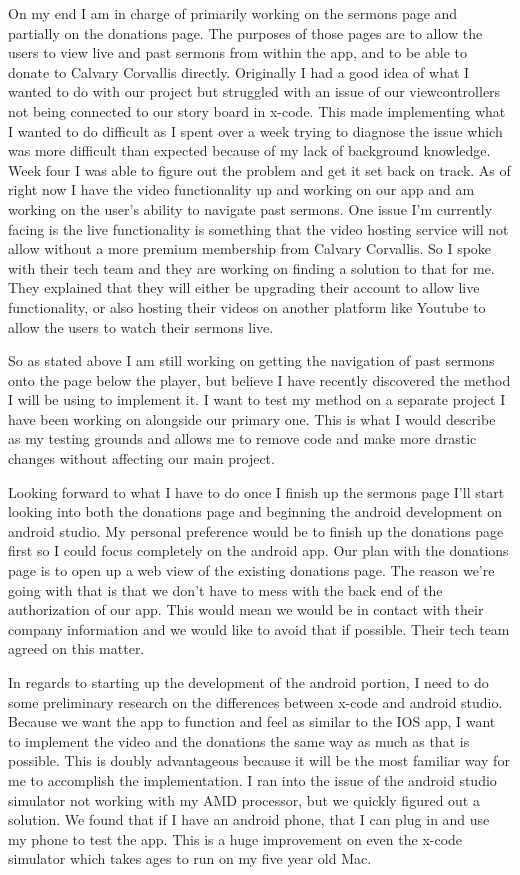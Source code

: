 \documentclass[letterpaper,10pt,draftclsnofoot,onecolumn,titlepage]{IEEEtran}
\begin{document}
	On my end I am in charge of primarily working on the sermons page and partially on the donations page.
	The purposes of those pages are to allow the users to view live and past sermons from within the app, and to be able to donate to Calvary Corvallis directly.
	Originally I had a good idea of what I wanted to do with our project but struggled with an issue of our viewcontrollers not being connected to our story board in x-code.
	This made implementing what I wanted to do difficult as I spent over a week trying to diagnose the issue which was more difficult than expected because of my lack of background knowledge.
	Week four I was able to figure out the problem and get it set back on track.
	As of right now I have the video functionality up and working on our app and am working on the user’s ability to navigate past sermons.
	One issue I’m currently facing is the live functionality is something that the video hosting service will not allow without a more premium membership from Calvary Corvallis.
	So I spoke with their tech team and they are working on finding a solution to that for me.
	They explained that they will either be upgrading their account to allow live functionality, or also hosting their videos on another platform like Youtube to allow the users to watch their sermons live.

	So as stated above I am still working on getting the navigation of past sermons onto the page below the player, but believe I have recently discovered the method I will be using to implement it.
	I want to test my method on a separate project I have been working on alongside our primary one.
	This is what I would describe as my testing grounds and allows me to remove code and make more drastic changes without affecting our main project.

	Looking forward to what I have to do once I finish up the sermons page I’ll start looking into both the donations page and beginning the android development on android studio.
	My personal preference would be to finish up the donations page first so I could focus completely on the android app.
	Our plan with the donations page is to open up a web view of the existing donations page.
	The reason we’re going with that is that we don’t have to mess with the back end of the authorization of our app.
	This would mean we would be in contact with their company information and we would like to avoid that if possible.
	Their tech team agreed on this matter.

	In regards to starting up the development of the android portion, I need to do some preliminary research on the differences between x-code and android studio.
	Because we want the app to function and feel as similar to the IOS app, I want to implement the video and the donations the same way as much as that is possible.
	This is doubly advantageous because it will be the most familiar way for me to accomplish the implementation.
	I ran into the issue of the android studio simulator not working with my AMD processor, but we quickly figured out a solution.
	We found that if I have an android phone, that I can plug in and use my phone to test the app.
	This is a huge improvement on even the x-code simulator which takes ages to run on my five year old Mac.
\end{document}
